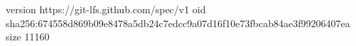 version https://git-lfs.github.com/spec/v1
oid sha256:674558d869b09e8478a5db24c7edcc9a07d16f10e73fbcab84ae3f99206407ea
size 11160
